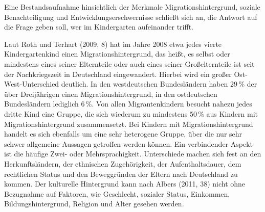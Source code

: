 Eine Bestandsaufnahme hinsichtlich der Merkmale Migrationshintergrund, soziale Benachteiligung und Entwicklungserschwernisse schließt sich an, die Antwort auf die Frage geben soll, wer im Kindergarten aufeinander trifft. 

Laut Roth und Terhart (2009, 8) hat im Jahre 2008 etwa jedes vierte Kindergartenkind einen Migrationshintergrund, das heißt, es selbst oder mindestens eines seiner Elternteile oder auch eines seiner Großelternteile ist seit der Nachkriegszeit in Deutschland eingewandert. Hierbei wird ein großer Ost-West-Unterschied deutlich. In den westdeutschen Bundesländern haben 29\,\% der über Dreijährigen einen Migrationshintergrund, in den ostdeutschen Bundesländern lediglich 6\,\%. Von allen Migrantenkindern besucht nahezu jedes dritte Kind eine Gruppe, die sich wiederum zu mindestens 50\,\% aus Kindern mit Migrationshintergrund zusammensetzt. Bei Kindern mit Migrationshintergrund handelt es sich ebenfalls um eine sehr heterogene Gruppe, über die nur sehr schwer allgemeine Aussagen getroffen werden können. Ein verbindender Aspekt ist die häufige Zwei- oder Mehrsprachigkeit. Unterschiede machen sich fest an den Herkunftsländern, der ethnischen Zugehörigkeit, der Aufenthaltsdauer, dem rechtlichen Status und den Beweggründen der Eltern nach Deutschland zu kommen. Der kulturelle Hintergrund kann nach Albers (2011, 38) nicht ohne Bezugnahme auf Faktoren, wie Geschlecht, sozialer Status, Einkommen, Bildungshintergrund, Religion und Alter gesehen werden.
 
